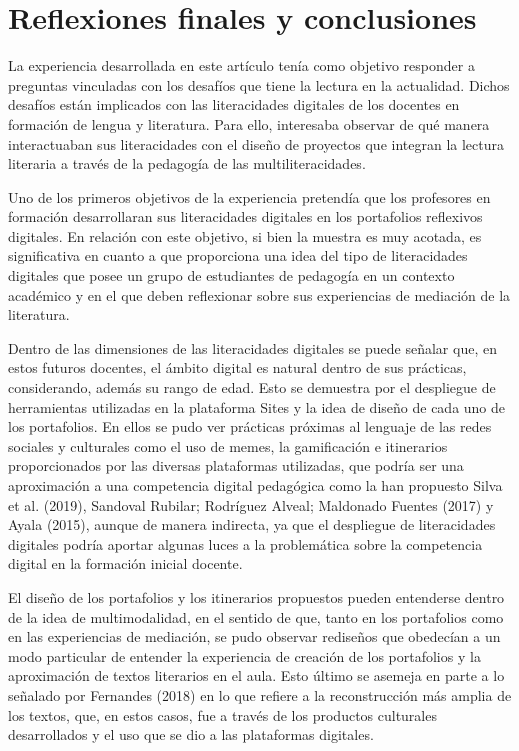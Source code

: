 \section{Reflexiones finales y conclusiones}\label{sec-reflexionesfinalesyconclusiones}

La experiencia desarrollada en este artículo tenía como objetivo
responder a preguntas vinculadas con los desafíos que tiene la lectura
en la actualidad. Dichos desafíos están implicados con las literacidades
digitales de los docentes en formación de lengua y literatura. Para
ello, interesaba observar de qué manera interactuaban sus literacidades
con el diseño de proyectos que integran la lectura literaria a través de
la pedagogía de las multiliteracidades.

Uno de los primeros objetivos de la experiencia pretendía que los
profesores en formación desarrollaran sus literacidades digitales en los
portafolios reflexivos digitales. En relación con este objetivo, si bien
la muestra es muy acotada, es significativa en cuanto a que proporciona
una idea del tipo de literacidades digitales que posee un grupo de
estudiantes de pedagogía en un contexto académico y en el que deben
reflexionar sobre sus experiencias de mediación de la literatura.

Dentro de las dimensiones de las literacidades digitales se puede
señalar que, en estos futuros docentes, el ámbito digital es natural
dentro de sus prácticas, considerando, además su rango de edad. Esto se
demuestra por el despliegue de herramientas utilizadas en la plataforma
Sites y la idea de diseño de cada uno de los portafolios. En ellos se
pudo ver prácticas próximas al lenguaje de las redes sociales y
culturales como el uso de memes, la gamificación e itinerarios
proporcionados por las diversas plataformas utilizadas, que podría ser
una aproximación a una competencia digital pedagógica como la han
propuesto Silva et al. (2019), Sandoval Rubilar; Rodríguez Alveal;
Maldonado Fuentes (2017) y Ayala (2015), aunque de manera indirecta, ya
que el despliegue de literacidades digitales podría aportar algunas
luces a la problemática sobre la competencia digital en la formación
inicial docente.

El diseño de los portafolios y los itinerarios propuestos pueden
entenderse dentro de la idea de multimodalidad, en el sentido de que,
tanto en los portafolios como en las experiencias de mediación, se pudo
observar rediseños que obedecían a un modo particular de entender la
experiencia de creación de los portafolios y la aproximación de textos
literarios en el aula. Esto último se asemeja en parte a lo señalado por
Fernandes (2018) en lo que refiere a la reconstrucción más amplia de los
textos, que, en estos casos, fue a través de los productos culturales
desarrollados y el uso que se dio a las plataformas digitales.

